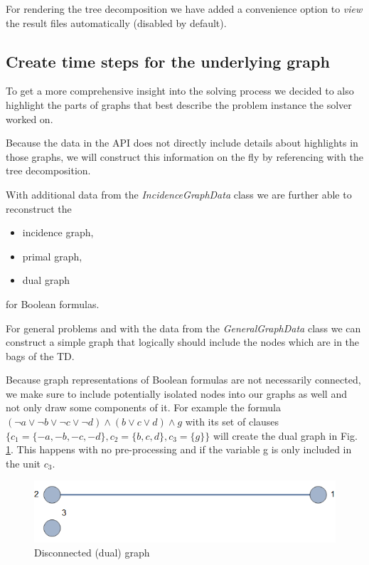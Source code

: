 \documentclass[a4paper, 12pt, bibliography=totoc]{scrartcl}
\begin{document}
For rendering the tree decomposition we have added a convenience option to \textit{view} the result files automatically (disabled by default).

\subsection{Create time steps for the underlying graph}
To get a more comprehensive insight into the solving process we decided to also highlight the parts of graphs that best describe the problem instance the solver worked on.

Because the data in the API does not directly include details about highlights in those graphs, we will construct this information on the fly by referencing with the tree decomposition.

With additional data from the \textit{IncidenceGraphData} class we are further able to reconstruct the
\begin{itemize}
	\item incidence graph,
	\item primal graph,
	\item dual graph
\end{itemize}
for Boolean formulas.

For general problems and with the data from the \textit{GeneralGraphData} class we can construct a simple graph that logically should include the nodes which are in the bags of the TD.

Because graph representations of Boolean formulas are not necessarily connected, we make sure to include potentially isolated nodes into our graphs as well and not only draw some components of it.
For example the formula $(\neg a\lor \neg b\lor \neg c\lor \neg d)\land (b\lor c\lor d)\land g$
with its set of clauses $\{c_{1}=\{-a,-b,-c,-d\},c_{2}=\{b,c,d\},c_{3}=\{g\}\}$ will create the dual graph in Fig. \ref{fig:disconnected123}. This happens with no pre-processing and if the variable g is only included in the unit $c_{3}$.

\begin{figure}[H]
	\centering
	\includegraphics{images/disconnected123.png}
	\caption{Disconnected (dual) graph}
	\label{fig:disconnected123}
\end{figure}
\end{document}
